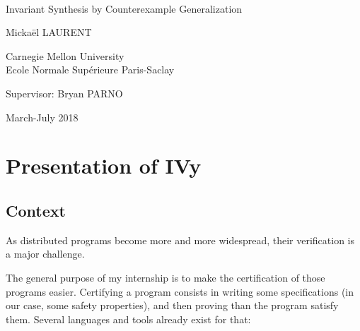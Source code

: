 \documentclass[11pt,a4paper,oldfontcommands]{memoir}
\begin{document}
%
%
\thispagestyle{empty}

{%
\sffamily
\centering
\Large

~\vspace{\fill}

{\huge 
Invariant Synthesis by Counterexample Generalization
}

\vspace{2.5cm}

{\LARGE
Mickaël LAURENT
}

\vspace{3.5cm}

Carnegie Mellon University\\
Ecole Normale Supérieure Paris-Saclay

\vspace{3.5cm}

Supervisor: Bryan PARNO

\vspace{\fill}

March-July 2018

}%

\clearpage%

\tableofcontents*

\clearpage


\chapter{Presentation of IVy}

    \section{Context}

    As distributed programs become more and more widespread, their verification is a major challenge.

    The general purpose of my internship is to make the certification of those programs easier.
    Certifying a program consists in writing some specifications (in our case, some safety properties), and then proving than the program satisfy them.
    Several languages and tools already exist for that:
\end{document}
